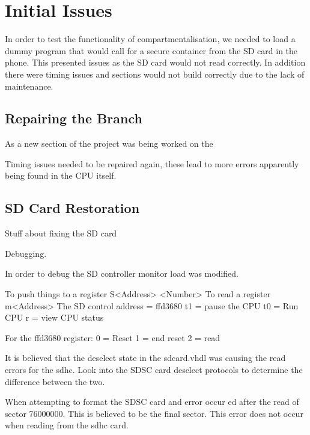 
\section{Initial Issues}

\label{Ch6 Sec2}

In order to test the functionality of compartmentalisation, we needed to load a dummy program that would call for a secure container from the SD card in the phone. This presented issues as the SD card would not read correctly. In addition there were timing issues and sections would not build correctly due to the lack of maintenance.

\subsection{Repairing the Branch}

\label{Ch6 Sec2 Sub1}

As a new section of the project was being worked on the 

Timing issues needed to be repaired again, these lead to more errors apparently being found in the CPU itself.

\subsection{SD Card Restoration}

\label{Ch6 Sec2 Sub2}

Stuff about fixing the SD card

Debugging.

In order to debug the SD controller monitor load was modified.

To push things to a register S<Address> <Number>
To read a register m<Address> 
The SD control address = ffd3680
t1 = pause the CPU
t0 = Run CPU
r = view CPU status

For the ffd3680 register:
0 = Reset
1 = end reset
2 = read

It is believed that the deselect state in the sdcard.vhdl was causing the read errors for the sdhc. Look into the SDSC card deselect protocols to determine the difference between the two.

When attempting to format the SDSC card and error occur ed after the read of sector 76000000. This is believed to be the final sector. This error does not occur when reading from the sdhc card.


